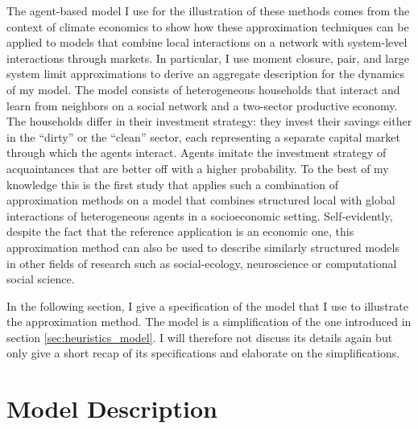 The agent-based model I use for the illustration of these methods comes from the context of climate economics to show how these approximation techniques can be applied to models that combine local interactions on a network with system-level interactions through markets.
In particular, I use moment closure, pair, and large system limit approximations to derive an aggregate description for the dynamics of my model.
The model consists of heterogeneous households that interact and learn from neighbors on a social network and a two-sector productive economy.
The households differ in their investment strategy: they invest their savings either in the ``dirty'' or the ``clean'' sector, each representing a separate capital market through which the agents interact.
Agents imitate the investment strategy of acquaintances that are better off with a higher probability.
To the best of my knowledge this is the first study that applies such a combination of approximation methods on a model that combines structured local with global interactions of heterogeneous agents in a socioeconomic setting.
Self-evidently, despite the fact that the reference application is an economic one, this approximation method can also be used to describe similarly structured models in other fields of research such as social-ecology, neuroscience or computational social science.

In the following section, I give a specification of the model that I use to illustrate the approximation method. The model is a simplification of the one introduced in section \ref{sec:heuristics_model}. I will therefore not discuss its details again but only give a short recap of its specifications and elaborate on the simplifications.

\section{Model Description}
\label{sec:approx_Model_Description}

